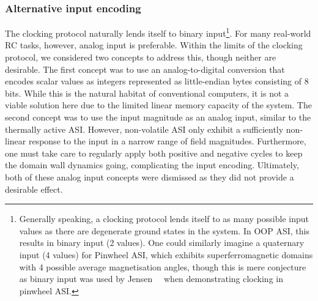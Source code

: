 \subsubsection{Alternative input encoding}
\label{sec:3:clocking_input_encoding}
The clocking protocol naturally lends itself to binary input\footnote{
	Generally speaking, a clocking protocol lends itself to as many possible input values as there are degenerate ground states in the system.
	In OOP ASI, this results in binary input (2 values).
	One could similarly imagine a quaternary input (4 values) for Pinwheel ASI, which exhibits superferromagnetic domains with 4 possible average magnetisation angles, though this is mere conjecture as binary input was used by Jensen~\etal~\cite{clocking-protocol} when demonstrating clocking in pinwheel ASI.
}.
For many real-world RC tasks, however, analog input is preferable.
Within the limits of the clocking protocol, we considered two concepts to address this, though neither are desirable.
The first concept was to use an analog-to-digital conversion that encodes scalar values as integers represented as little-endian bytes consisting of 8 bits.
While this is the natural habitat of conventional computers, it is not a viable solution here due to the limited linear memory capacity of the system.
The second concept was to use the input magnitude as an analog input, similar to the thermally active ASI.
However, non-volatile ASI only exhibit a sufficiently non-linear response to the input in a narrow range of field magnitudes.
Furthermore, one must take care to regularly apply both positive and negative cycles to keep the domain wall dynamics going, complicating the input encoding.
Ultimately, both of these analog input concepts were dismissed as they did not provide a desirable effect.

